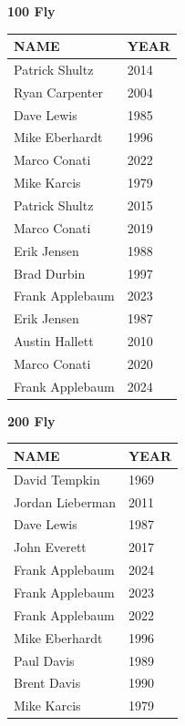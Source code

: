 \begin{table}[H]
\centering
\begin{minipage}[t]{0.48\textwidth}
\centering
\textbf{100 Fly}\\[0.1cm]
\begin{tabular}{@{}p{2.8cm}p{1.2cm}@{}}
\hline
    \textbf{NAME} & \textbf{YEAR} \\
\hline
    Patrick Shultz & 2014 \\
    Ryan Carpenter & 2004 \\
    Dave Lewis & 1985 \\
    Mike Eberhardt & 1996 \\
    Marco Conati & 2022 \\
    Mike Karcis & 1979 \\
    Patrick Shultz & 2015 \\
    Marco Conati & 2019 \\
    Erik Jensen & 1988 \\
    Brad Durbin & 1997 \\
    Frank Applebaum & 2023 \\
    Erik Jensen & 1987 \\
    Austin Hallett & 2010 \\
    Marco Conati & 2020 \\
    Frank Applebaum & 2024 \\
\hline
\end{tabular}
\end{minipage}\hfill
\begin{minipage}[t]{0.48\textwidth}
\centering
\textbf{200 Fly}\\[0.1cm]
\begin{tabular}{@{}p{2.8cm}p{1.2cm}@{}}
\hline
    \textbf{NAME} & \textbf{YEAR} \\
\hline
    David Tempkin & 1969 \\
    Jordan Lieberman & 2011 \\
    Dave Lewis & 1987 \\
    John Everett & 2017 \\
    Frank Applebaum & 2024 \\
    Frank Applebaum & 2023 \\
    Frank Applebaum & 2022 \\
    Mike Eberhardt & 1996 \\
    Paul Davis & 1989 \\
    Brent Davis & 1990 \\
    Mike Karcis & 1979 \\
\hline
\end{tabular}
\end{minipage}
\end{table}


